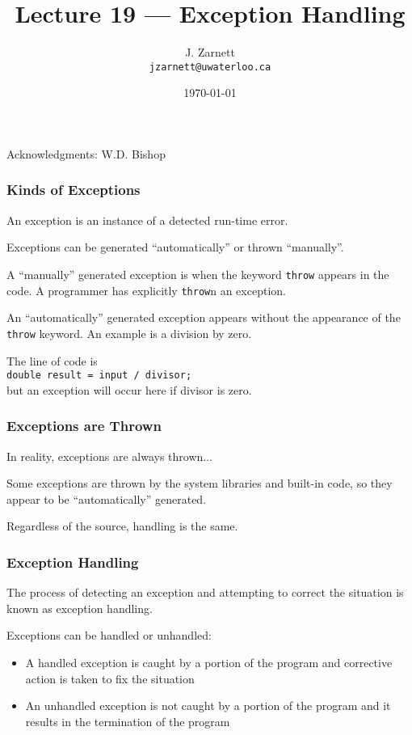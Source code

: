 

\title{Lecture 19 --- Exception Handling }

\author{J. Zarnett\\
\texttt{jzarnett@uwaterloo.ca}}
\date{\today}



\begin{frame}
  \titlepage
  
  \begin{center}
  \small{Acknowledgments: W.D. Bishop}
  \end{center}
\end{frame}

\begin{frame}
\frametitle{Kinds of Exceptions}

An exception is an instance of a detected run-time error.

Exceptions can be generated ``automatically'' or thrown ``manually''.

A ``manually'' generated exception is when the keyword \texttt{throw} appears in the code. A programmer has explicitly \texttt{throw}n an exception.

An ``automatically'' generated exception appears without the appearance of the \texttt{throw} keyword. An example is a division by zero.

The line of code is\\
\quad \texttt{double result = input / divisor; }\\
 but an exception will occur here if divisor is zero.

\end{frame}


\begin{frame}
\frametitle{Exceptions are Thrown}


In reality, exceptions are always thrown... 

Some exceptions are thrown by the system libraries and built-in code, so they appear to be ``automatically'' generated.

Regardless of the source, handling is the same.

\end{frame}


\begin{frame}
\frametitle{Exception Handling}

The process of detecting an exception and attempting to correct the situation is known as exception handling.

Exceptions can be handled or unhandled:
\begin{itemize}
	\item A \alert{handled} exception is caught by a portion of the program and corrective action is taken to fix the situation
	\item An \alert{unhandled} exception is not caught by a portion of the program and it results in the termination of the program
\end{itemize}

\end{frame}

